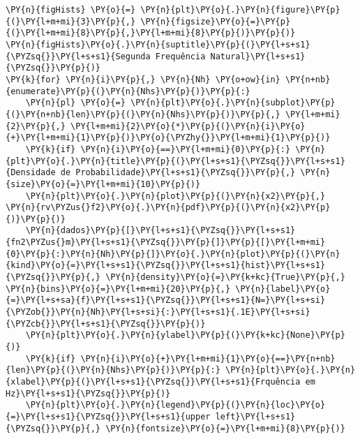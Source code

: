     \begin{tcolorbox}[breakable, size=fbox, boxrule=1pt, pad at break*=1mm,colback=cellbackground, colframe=cellborder]
\begin{Verbatim}[commandchars=\\\{\}]
\PY{n}{figHists} \PY{o}{=} \PY{n}{plt}\PY{o}{.}\PY{n}{figure}\PY{p}{(}\PY{l+m+mi}{3}\PY{p}{,} \PY{n}{figsize}\PY{o}{=}\PY{p}{(}\PY{l+m+mi}{8}\PY{p}{,}\PY{l+m+mi}{8}\PY{p}{)}\PY{p}{)}
\PY{n}{figHists}\PY{o}{.}\PY{n}{suptitle}\PY{p}{(}\PY{l+s+s1}{\PYZsq{}}\PY{l+s+s1}{Segunda Frequência Natural}\PY{l+s+s1}{\PYZsq{}}\PY{p}{)}
\PY{k}{for} \PY{n}{i}\PY{p}{,} \PY{n}{Nh} \PY{o+ow}{in} \PY{n+nb}{enumerate}\PY{p}{(}\PY{n}{Nhs}\PY{p}{)}\PY{p}{:}
    \PY{n}{pl} \PY{o}{=} \PY{n}{plt}\PY{o}{.}\PY{n}{subplot}\PY{p}{(}\PY{n+nb}{len}\PY{p}{(}\PY{n}{Nhs}\PY{p}{)}\PY{p}{,} \PY{l+m+mi}{2}\PY{p}{,} \PY{l+m+mi}{2}\PY{o}{*}\PY{p}{(}\PY{n}{i}\PY{o}{+}\PY{l+m+mi}{1}\PY{p}{)}\PY{o}{\PYZhy{}}\PY{l+m+mi}{1}\PY{p}{)}
    \PY{k}{if} \PY{n}{i}\PY{o}{==}\PY{l+m+mi}{0}\PY{p}{:} \PY{n}{plt}\PY{o}{.}\PY{n}{title}\PY{p}{(}\PY{l+s+s1}{\PYZsq{}}\PY{l+s+s1}{Densidade de Probabilidade}\PY{l+s+s1}{\PYZsq{}}\PY{p}{,} \PY{n}{size}\PY{o}{=}\PY{l+m+mi}{10}\PY{p}{)}
    \PY{n}{plt}\PY{o}{.}\PY{n}{plot}\PY{p}{(}\PY{n}{x2}\PY{p}{,} \PY{n}{rv\PYZus{}f2}\PY{o}{.}\PY{n}{pdf}\PY{p}{(}\PY{n}{x2}\PY{p}{)}\PY{p}{)}
    \PY{n}{dados}\PY{p}{[}\PY{l+s+s1}{\PYZsq{}}\PY{l+s+s1}{fn2\PYZus{}m}\PY{l+s+s1}{\PYZsq{}}\PY{p}{]}\PY{p}{[}\PY{l+m+mi}{0}\PY{p}{:}\PY{n}{Nh}\PY{p}{]}\PY{o}{.}\PY{n}{plot}\PY{p}{(}\PY{n}{kind}\PY{o}{=}\PY{l+s+s1}{\PYZsq{}}\PY{l+s+s1}{hist}\PY{l+s+s1}{\PYZsq{}}\PY{p}{,} \PY{n}{density}\PY{o}{=}\PY{k+kc}{True}\PY{p}{,} \PY{n}{bins}\PY{o}{=}\PY{l+m+mi}{20}\PY{p}{,} \PY{n}{label}\PY{o}{=}\PY{l+s+sa}{f}\PY{l+s+s1}{\PYZsq{}}\PY{l+s+s1}{N=}\PY{l+s+si}{\PYZob{}}\PY{n}{Nh}\PY{l+s+si}{:}\PY{l+s+s1}{.1E}\PY{l+s+si}{\PYZcb{}}\PY{l+s+s1}{\PYZsq{}}\PY{p}{)}
    \PY{n}{plt}\PY{o}{.}\PY{n}{ylabel}\PY{p}{(}\PY{k+kc}{None}\PY{p}{)}
    \PY{k}{if} \PY{n}{i}\PY{o}{+}\PY{l+m+mi}{1}\PY{o}{==}\PY{n+nb}{len}\PY{p}{(}\PY{n}{Nhs}\PY{p}{)}\PY{p}{:} \PY{n}{plt}\PY{o}{.}\PY{n}{xlabel}\PY{p}{(}\PY{l+s+s1}{\PYZsq{}}\PY{l+s+s1}{Frquência em Hz}\PY{l+s+s1}{\PYZsq{}}\PY{p}{)}
    \PY{n}{plt}\PY{o}{.}\PY{n}{legend}\PY{p}{(}\PY{n}{loc}\PY{o}{=}\PY{l+s+s1}{\PYZsq{}}\PY{l+s+s1}{upper left}\PY{l+s+s1}{\PYZsq{}}\PY{p}{,} \PY{n}{fontsize}\PY{o}{=}\PY{l+m+mi}{8}\PY{p}{)}


\end{Verbatim}
\end{tcolorbox}
